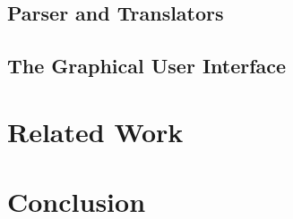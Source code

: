 \documentclass[sigplan,screen,anonymous,review]{acmart}\settopmatter{printfolios=true,printccs=false,printacmref=false}
\begin{document}
\subsection{Parser and Translators}
\label{sub:parser}

\subsection{The Graphical User Interface}
\label{sub:gui}

\section{Related Work}
\label{sec:rw}

\section{Conclusion}
\label{sec:conc}


\end{document}

